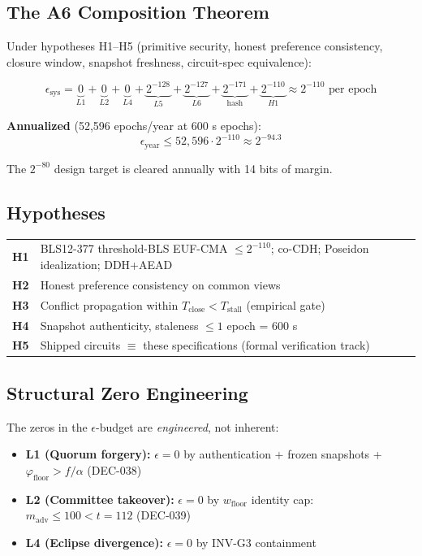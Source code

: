 \documentclass[11pt, a4paper]{article}
\begin{document}
\subsection{The A6 Composition Theorem}

Under hypotheses H1--H5 (primitive security, honest preference consistency, closure window, snapshot freshness, circuit-spec equivalence):

\begin{equation}
\epsilon_{\text{sys}} = \underbrace{0}_{L1} + \underbrace{0}_{L2} + \underbrace{0}_{L4} + \underbrace{2^{-128}}_{L5} + \underbrace{2^{-127}}_{L6} + \underbrace{2^{-171}}_{\text{hash}} + \underbrace{2^{-110}}_{H1} \approx 2^{-110} \text{ per epoch}
\end{equation}

\textbf{Annualized} (52,596 epochs/year at 600 s epochs):
\begin{equation}
\epsilon_{\text{year}} \le 52{,}596 \cdot 2^{-110} \approx 2^{-94.3}
\end{equation}

The $2^{-80}$ design target is cleared annually with 14 bits of margin.

\subsection{Hypotheses}

\begin{center}
\begin{tabular}{l|l}
\textbf{H1} & BLS12-377 threshold-BLS EUF-CMA $\le 2^{-110}$; co-CDH; Poseidon idealization; DDH+AEAD \\
\textbf{H2} & Honest preference consistency on common views \\
\textbf{H3} & Conflict propagation within $T_{\text{close}} < T_{\text{stall}}$ (empirical gate) \\
\textbf{H4} & Snapshot authenticity, staleness $\le 1$ epoch = 600 s \\
\textbf{H5} & Shipped circuits $\equiv$ these specifications (formal verification track) \\
\end{tabular}
\end{center}

\subsection{Structural Zero Engineering}

The zeros in the $\epsilon$-budget are \textit{engineered}, not inherent:
\begin{itemize}
    \item \textbf{L1 (Quorum forgery):} $\epsilon = 0$ by authentication + frozen snapshots + $\varphi_{\text{floor}} > f/\alpha$ (DEC-038)
    \item \textbf{L2 (Committee takeover):} $\epsilon = 0$ by $w_{\text{floor}}$ identity cap: $m_{\text{adv}} \le 100 < t = 112$ (DEC-039)
    \item \textbf{L4 (Eclipse divergence):} $\epsilon = 0$ by INV-G3 containment
\end{itemize}
\end{document}
